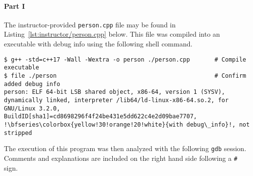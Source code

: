 \documentclass[11pt, letterpaper]{article} %
\begin{document}
\paragraph{Part I}
The instructor-provided \texttt{person.cpp} file may be found in Listing~\ref{lst:instructor/person.cpp} below. This file was compiled into an executable with debug info using the following shell command.
\begin{lstlisting}[style=labreportstyle-sh,escapechar=!]
$ g++ -std=c++17 -Wall -Wextra -o person ./person.cpp       # Compile executable
$ file ./person                                             # Confirm added debug info
person: ELF 64-bit LSB shared object, x86-64, version 1 (SYSV), dynamically linked, interpreter /lib64/ld-linux-x86-64.so.2, for GNU/Linux 3.2.0, BuildID[sha1]=cd8698296f4f24be431e5dd622c4e2d09bae7707, !\bfseries\colorbox{yellow!30!orange!20!white}{with debug\_info}!, not stripped
\end{lstlisting}
The execution of this program was then analyzed with the following \texttt{gdb} session. Comments and explanations are included on the right hand side following a \texttt{\#} sign.
\end{document}
